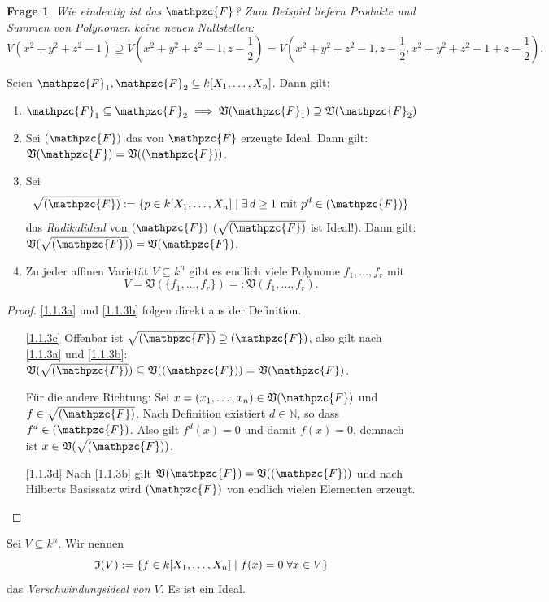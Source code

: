 \documentclass[a4paper,12pt]{scrbook}
\newtheorem{q}{Frage}
\newtheorem{proof}{Beweis}
\def\V{\mathfrak{V}}
\def\I{\mathfrak{I}}
\newcommand{\F}{\mathpzc{F}}
\newcommand{\set}[1]{\ensuremath{\mathbb{#1}}}
\newcommand{\N}{\set{N}}
\newcommand{\polyx}[1][n]{\ensuremath%
  [X_{1},\dotsc,X_{#1}]}
\begin{document}
\begin{q}Wie eindeutig ist das $\F$? Zum Beispiel liefern Produkte und Summen von Polynomen keine neuen Nullstellen:
\[V(x^{2}+y^{2}+z^{2}-1) \supseteq V(x^{2}+y^{2}+z^{2}-1, z-\frac{1}{2}) = V(x^{2}+y^{2}+z^{2}-1, z-\frac{1}{2}, x^{2}+y^{2}+z^{2}-1 + z-\frac{1}{2}).\]
\end{q}

\begin{bem}\label{1.1.3} Seien $\F_{1},\F_{2}\subseteq k\polyx$. Dann gilt:
\begin{enumerate}
\item{} $\F_{1}\subseteq\F_{2}\implies \V(\F_{1})\supseteq \V(\F_{2})$
\item{} Sei $(\F)$ das von $\F$ erzeugte Ideal. Dann gilt: $\V(\F) = \V((\F))$.
\item{} Sei
\[\sqrt{(\F)}:=\{p\in k\polyx\mid\exists\, d\geq 1\text{ mit }p^{d}\in(\F)\}\]
das \emph{Radikalideal} von $(\F)$ ($\sqrt{(\F)}$ ist Ideal!). Dann gilt: $\V(\sqrt{(\F)})=\V(\F)$.
\item{} Zu jeder affinen Varietät $V\subseteq k^{n}$ gibt es endlich viele Polynome $f_{1},\dotsc,f_{r}$ mit \[V=\V(\{f_{1},\dotsc,f_{r}\})=:\V(f_{1},\dotsc,f_{r}).\]
\end{enumerate}
\end{bem}

\begin{proof}
\ref{1.1.3a} und \ref{1.1.3b} folgen direkt aus der Definition.
\begin{enumerate}%
\item[\ref{1.1.3c}] Offenbar ist $\sqrt{(\F)}\supseteq(\F)$, also gilt nach \ref{1.1.3a} und \ref{1.1.3b}: $\V(\sqrt{(\F)})\subseteq \V((\F))=\V(\F)$.

Für die andere Richtung: Sei $x=(x_{1},\dotsc,x_{n})\in \V(\F)$ und $f\in\sqrt{(\F)}$. Nach Definition existiert $d\in\N$, so dass $f^{d}\in(\F)$. Also gilt $f^{d}(x)=0$ und damit $f(x)=0$, demnach ist $x\in \V(\sqrt{(\F)})$.
\item[\ref{1.1.3d}] Nach \ref{1.1.3b} gilt $\V(\F)=\V((\F))$ und nach Hilberts Basissatz wird $(\F)$ von endlich vielen Elementen erzeugt.
\end{enumerate}
\end{proof}

\begin{db}
Sei $V\subseteq k^{n}$. Wir nennen
\[\I(V):=\{f\in k\polyx\mid f(x)=0\;\forall x\in V\}\]
das \emph{Verschwindungsideal von $V$}. Es ist ein Ideal.
\end{db}
\end{document}
